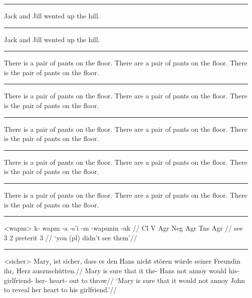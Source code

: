 \documentclass[12pt]{article}
\begin{document}
\hrule\medskip

\begingroup
\ex *Jack and Jill wented up the hill.\xe
\endgroup
\bigskip

\hrule\medskip

\begingroup
\ex \judge* Jack and Jill wented up the hill.\xe
\endgroup
\bigskip

\hrule\medskip

\begingroup
\pex
\a There is a pair of pants on the floor.
\a {}There are a pair of pants on the floor.
\a \judge*There is the pair of pants on the floor.
\xe
\endgroup
\bigskip

\hrule\medskip

\begingroup
\pex
\a There is a pair of pants on the floor.
\a {}There are a pair of pants on the floor.
\a \ljudge*There is the pair of pants on the floor.
\xe
\endgroup
\bigskip

\hrule\medskip

\begingroup
\pex[*=?*]
\a There is a pair of pants on the floor.
\a {}There are a pair of pants on the floor.
\a \ljudge*There is the pair of pants on the floor.
\xe
\endgroup
\bigskip

\hrule\medskip

\begingroup
\pex[*]
\a There is a pair of pants on the floor.
\a \ljudge* There are a pair of pants on the floor.
\a \ljudge* There is the pair of pants on the floor.
\xe
\endgroup
\bigskip

\hrule\medskip

\begingroup
\pex[textoffset=!.7em]
\a There is a pair of pants on the floor.
\a {} There are a pair of pants on the floor.
\a \ljudge* There is the pair of pants on the floor.
\xe
\endgroup
\bigskip

\hrule\medskip

\begingroup
\ex<wapm>
\begingl
\gla k- wapm -a -s'i -m -wapunin -uk //
\glb Cl V Agr Neg Agr Tns Agr //
 see 3 {} 2 preterit 3 //
\glft `you (pl) didn't see them'//
\endgl
\xe
\endgroup
\bigskip

\hrule\medskip

\begingroup
\ex<sicher>
\begingl
\gla Mary$_i$ ist sicher, dass es den Hans nicht st\"oren w\"urde
seiner Freundin ihr$_i$ Herz auszusch\"utten.//
\glb Mary is sure that it the- Hans not annoy would
his- girlfriend- her- heart- {out to
throw}//
\glft  `Mary is sure that it would not annoy John to reveal her
heart to his girlfriend.'//
\endgl
\xe
\endgroup
\bigskip
\end{document}
